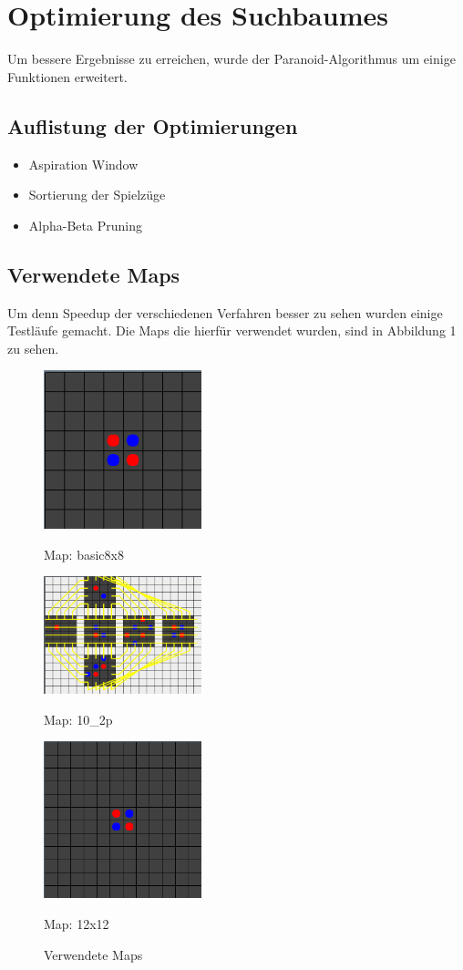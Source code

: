 \documentclass[12pt,a4paper,bibliography=totocnumbered,listof=totocnumbered]{scrartcl}
\begin{document}
\section{Optimierung des Suchbaumes}
Um bessere Ergebnisse zu erreichen, wurde der Paranoid-Algorithmus um einige Funktionen erweitert.
\subsection{Auflistung der Optimierungen}
\begin{itemize}
\item Aspiration Window
\item Sortierung der Spielzüge
\item Alpha-Beta Pruning
\end{itemize}

\subsection{Verwendete Maps}
Um denn Speedup der verschiedenen Verfahren besser zu sehen wurden einige Testläufe gemacht.
Die Maps die hierfür verwendet wurden, sind in Abbildung 1 zu sehen.

\begin{figure}
\centering
\begin{minipage}[t]{1.8in}
{\includegraphics[width=1.8in]{pics/map_basic8x8}\caption*{Map: basic8x8}}
\end{minipage}
\begin{minipage}[t]{1.8in}
\includegraphics[width=1.8in]{pics/map_10_2p}\caption*{Map: 10\_2p}
\end{minipage}
\begin{minipage}[t]{1.8in}
\includegraphics[width=1.8in]{pics/map_12x12}\caption*{Map: 12x12}
\end{minipage}
\caption{Verwendete Maps}
\end{figure}
\pagebreak
\end{document}
